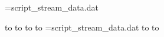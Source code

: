 \relax
{}=script_stream_data.dat\relax

 to\first[\first]
 to\second[\second]
 to\third[\third]
 to\fourth[\fourth]
=script_stream_data.dat\relax
{} to\again[\again]
 to\secondagain[\secondagain]

